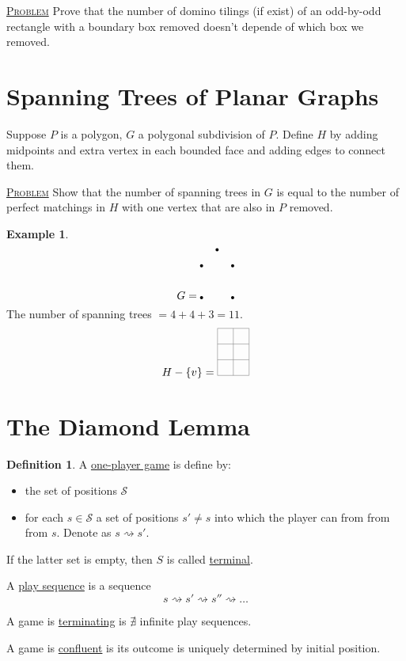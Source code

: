\documentclass{report}
\newcommand{\fancyem}[1]{\underline{\textsc{#1}}}
\theoremstyle{definition}
\newtheorem{definition}{Definition}[section]
\newtheorem{example}{Example}[section]
\theoremstyle{remark}
\numberwithin{equation}{section}
\begin{document}
\fancyem{Problem} Prove that the number of domino tilings (if exist) of an odd-by-odd rectangle with a boundary box removed doesn't depende of which box we removed.

\section{Spanning Trees of Planar Graphs}
Suppose $P$ is a polygon, $G$ a polygonal subdivision of $P$. Define $H$ by adding midpoints and extra vertex in each bounded face and adding edges to connect them.

\fancyem{Problem} Show that the number of spanning trees in $G$ is equal to the number of perfect matchings in $H$ with one vertex that are also in $P$ removed.

\begin{example}
    \[
        G = \begin{tikzpicture}
\node[shape=circle, fill=black, scale = 0.3] (A1) at (0.5, 1.5) {};
\node[shape=circle, fill=black, scale = 0.3] (A2) at (0, 0) {};
\node[shape=circle, fill=black, scale = 0.3] (A3) at (1, 0) {};
\node[shape=circle, fill=black, scale = 0.3] (A4) at (0, 1) {};
\node[shape=circle, fill=black, scale = 0.3] (A5) at (1, 1) {};
        \end{tikzpicture}
    \]
    The number of spanning trees $= 4 + 4 + 3 = 11$.
    \[
        H - \{v\} = \begin{tikzpicture}
            \draw[step = 0.5cm, gray, thin] (0, 0) grid (1, 1.5);
        \end{tikzpicture} 
    \]
\end{example}

\section{The Diamond Lemma}
\begin{definition}
    A \underline{one-player game} is define by:
    \begin{itemize}
        \item the set of positions $\mathcal{S}$
        \item for each $s \in \mathcal{S}$ a set of positions $s' \neq s$ into which the player can from from from $s$. Denote as $s \rightsquigarrow s'$.
    \end{itemize}
    If the latter set is empty, then $S$ is called \underline{terminal}.

    A \underline{play sequence} is a sequence
    \[s \rightsquigarrow s' \rightsquigarrow s'' \rightsquigarrow \ldots\]

    A game is \underline{terminating} is $\nexists$ infinite play sequences.

    A game is \underline{confluent} is its outcome is uniquely determined by initial position.
\end{definition}
\end{document}
